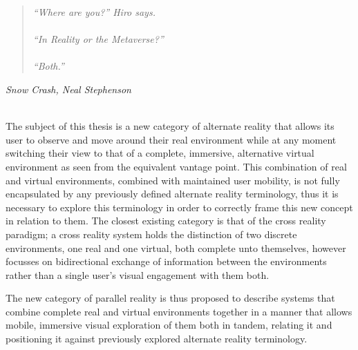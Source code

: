 \begin{quote}
\textit{``Where are you?'' Hiro says.
\\
\\
``In Reality or the Metaverse?''
\\
\\
``Both.''}
\end{quote}
\hfill \textit{Snow Crash, Neal Stephenson}
\\
\\


\label{chapter-background}



The subject of this thesis is a new category of alternate reality that allows its user to observe and move around their real environment while at any moment switching their view to that of a complete, immersive, alternative virtual environment as seen from the equivalent vantage point. This combination of real and virtual environments, combined with maintained user mobility, is not fully encapsulated by any previously defined alternate reality terminology, thus it is necessary to explore this terminology in order to correctly frame this new concept in relation to them. The closest existing category is that of the cross reality paradigm; a cross reality system holds the distinction of two discrete environments, one real and one virtual, both complete unto themselves, however focusses on bidirectional exchange of information between the environments rather than a single user's visual engagement with them both.

The new category of parallel reality is thus proposed to describe systems that combine complete real and virtual environments together in a manner that allows mobile, immersive visual exploration of them both in tandem, relating it and positioning it against previously explored alternate reality terminology.


